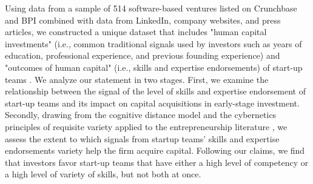 \documentclass[12pt]{article}
\begin{document}
Using data from a sample of 514 software-based ventures listed on Crunchbase and BPI combined with data from LinkedIn, company websites, and press articles, we constructed a unique dataset that includes "human capital investments" (i.e., common traditional signals used by investors such as years of education, professional experience, and previous founding experience) and "outcomes of human capital" (i.e., skills and expertise endorsements) of start-up teams \citep{marvel2016human}. We analyze our statement in two stages. First, we examine the relationship between the signal of the level of skills and expertise endorsement of start-up teams and its impact on capital acquisitions in early-stage investment. Secondly, drawing from the cognitive distance model \citep{nooteboom2007optimal} and the cybernetics principles of requisite variety applied to the entrepreneurship literature \citep{ashby1957introduction, harrison2007s}, we assess the extent to which signals from startup teams' skills and expertise endorsements variety help the firm acquire capital. Following our claims, we find that investors favor start-up teams that have either a high level of competency or a high level of variety of skills, but not both at once.
\end{document}

